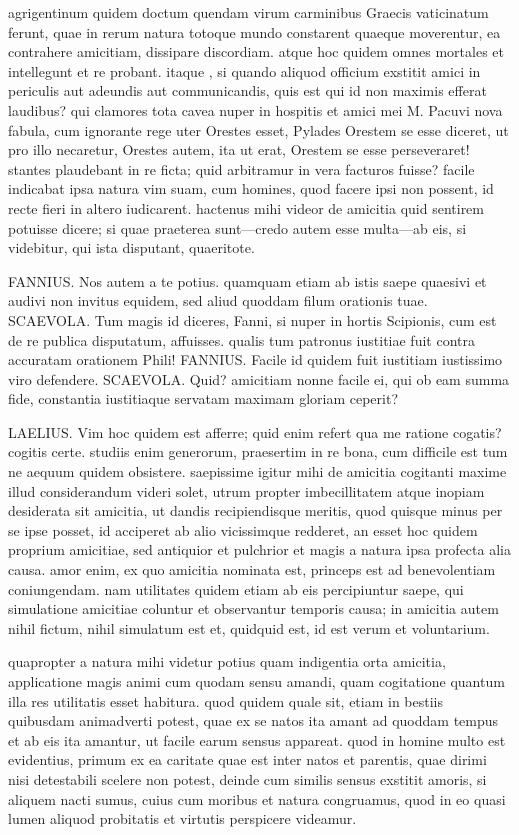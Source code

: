  agrigentinum quidem doctum quendam virum carminibus Graecis vaticinatum ferunt, quae in rerum natura totoque mundo constarent quaeque moverentur, ea contrahere amicitiam, dissipare discordiam. atque hoc quidem omnes mortales et intellegunt et re probant. itaque , si quando aliquod officium exstitit amici in periculis aut adeundis aut communicandis, quis est qui id non maximis efferat laudibus? qui clamores tota cavea nuper in hospitis et amici mei M. Pacuvi nova fabula, cum ignorante rege uter Orestes esset, Pylades Orestem se esse diceret, ut pro illo necaretur, Orestes autem, ita ut erat, Orestem se esse perseveraret! stantes plaudebant in re ficta; quid arbitramur in vera facturos fuisse? facile indicabat ipsa natura vim suam, cum homines, quod facere ipsi non possent, id recte fieri in altero iudicarent. hactenus mihi videor de amicitia quid sentirem potuisse dicere; si quae praeterea sunt—credo autem esse multa—ab eis, si videbitur, qui ista disputant, quaeritote.

 FANNIUS. Nos autem a te potius. quamquam etiam ab istis saepe quaesivi et audivi non invitus equidem, sed aliud quoddam filum orationis tuae. SCAEVOLA. Tum magis id diceres, Fanni, si nuper in hortis Scipionis, cum est de re publica disputatum, affuisses. qualis tum patronus iustitiae fuit contra accuratam orationem Phili! FANNIUS. Facile id quidem fuit iustitiam iustissimo viro defendere. SCAEVOLA. Quid? amicitiam nonne facile ei, qui ob eam summa fide, constantia iustitiaque servatam maximam gloriam ceperit?

 LAELIUS. Vim hoc quidem est afferre; quid enim refert qua me ratione cogatis? cogitis certe. studiis enim generorum, praesertim in re bona, cum difficile est tum ne aequum quidem obsistere. saepissime igitur mihi de amicitia cogitanti maxime illud considerandum videri solet, utrum propter imbecillitatem atque inopiam desiderata sit amicitia, ut dandis recipiendisque meritis, quod quisque minus per se ipse posset, id acciperet ab alio vicissimque redderet, an esset hoc quidem proprium amicitiae, sed antiquior et pulchrior et magis a natura ipsa profecta alia causa. amor enim, ex quo amicitia nominata est, princeps est ad benevolentiam coniungendam. nam utilitates quidem etiam ab eis percipiuntur saepe, qui simulatione amicitiae coluntur et observantur temporis causa; in amicitia autem nihil fictum, nihil simulatum est et, quidquid est, id est verum et voluntarium.

 quapropter a natura mihi videtur potius quam indigentia orta amicitia, applicatione magis animi cum quodam sensu amandi, quam cogitatione quantum illa res utilitatis esset habitura. quod quidem quale sit, etiam in bestiis quibusdam animadverti potest, quae ex se natos ita amant ad quoddam tempus et ab eis ita amantur, ut facile earum sensus appareat. quod in homine multo est evidentius, primum ex ea caritate quae est inter natos et parentis, quae dirimi nisi detestabili scelere non potest, deinde cum similis sensus exstitit amoris, si aliquem nacti sumus, cuius cum moribus et natura congruamus, quod in eo quasi lumen aliquod probitatis et virtutis perspicere videamur.

